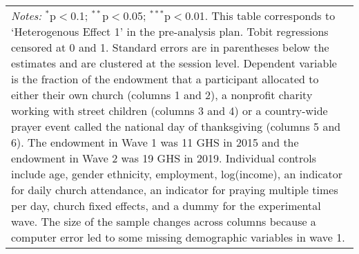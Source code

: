\begin{table}[!htbp]
\begin{tabular}{@{\extracolsep{5pt}}lcccccc}
\multicolumn{7}{l}{ \parbox[t]{0.95\linewidth}{\small{ \textit{Notes:} $^{*}$p$<$0.1; $^{**}$p$<$0.05; $^{***}$p$<$0.01}. This table corresponds to `Heterogenous Effect 1' in the pre-analysis plan. Tobit regressions censored at 0 and 1. Standard errors are in parentheses below the estimates and are clustered at the session level. Dependent variable is the fraction of the endowment that a participant allocated to either their own church (columns 1 and 2), a nonprofit charity working with street children (columns 3 and 4) or a country-wide prayer event called the national day of thanksgiving (columns 5 and 6). The endowment in Wave 1 was 11 GHS in 2015 and the endowment in Wave 2 was 19 GHS in 2019. Individual controls include age, gender ethnicity, employment, log(income), an indicator for daily church attendance, an indicator for praying multiple times per day, church fixed effects, and a dummy for the experimental wave. The size of the sample changes across columns because a computer error led to some missing demographic variables in wave 1. }}\\
\end{tabular} 
\end{table} 
